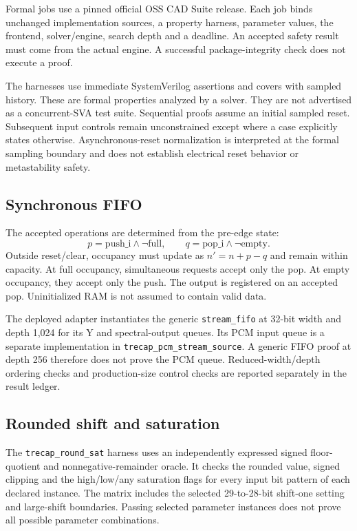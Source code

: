 Formal jobs use a pinned official OSS CAD Suite release. Each job binds unchanged implementation sources, a property harness, parameter values, the frontend, solver/engine, search depth and a deadline. An accepted safety result must come from the actual engine. A successful package-integrity check does not execute a proof.

The harnesses use immediate SystemVerilog assertions and covers with sampled history. These are formal properties analyzed by a solver. They are not advertised as a concurrent-SVA test suite. Sequential proofs assume an initial sampled reset. Subsequent input controls remain unconstrained except where a case explicitly states otherwise. Asynchronous-reset normalization is interpreted at the formal sampling boundary and does not establish electrical reset behavior or metastability safety.

\subsection{Synchronous FIFO}
The accepted operations are determined from the pre-edge state:
\[
 p=\mathrm{push\_i}\land\neg\mathrm{full},\qquad
 q=\mathrm{pop\_i}\land\neg\mathrm{empty}.
\]
Outside reset/clear, occupancy must update as $n'=n+p-q$ and remain within capacity. At full occupancy, simultaneous requests accept only the pop. At empty occupancy, they accept only the push. The output is registered on an accepted pop. Uninitialized RAM is not assumed to contain valid data.

The deployed adapter instantiates the generic \texttt{stream\_fifo} at 32-bit width and depth 1,024 for its Y and spectral-output queues. Its PCM input queue is a separate implementation in \texttt{trecap\_pcm\_stream\_source}. A generic FIFO proof at depth 256 therefore does not prove the PCM queue. Reduced-width/depth ordering checks and production-size control checks are reported separately in the result ledger.

\subsection{Rounded shift and saturation}
The \texttt{trecap\_round\_sat} harness uses an independently expressed signed floor-quotient and nonnegative-remainder oracle. It checks the rounded value, signed clipping and the high/low/any saturation flags for every input bit pattern of each declared instance. The matrix includes the selected 29-to-28-bit shift-one setting and large-shift boundaries. Passing selected parameter instances does not prove all possible parameter combinations.


